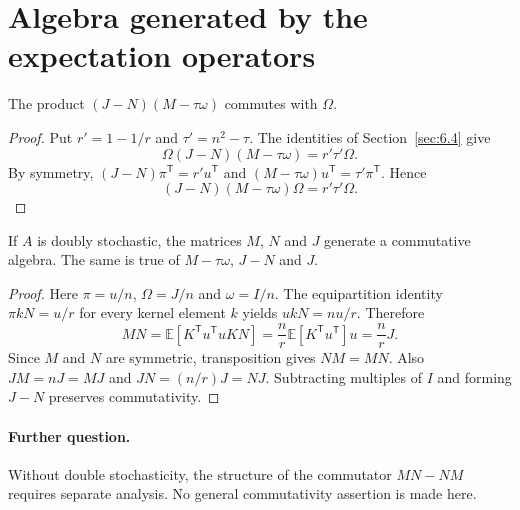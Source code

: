 
\section{Algebra generated by the expectation operators}
\label{sec:6.9}
\begin{proposition}\label{prop:6.5}
The product $(J-N)(M-\tau\omega)$ commutes with $\Omega$.
\end{proposition}
\begin{proof}
Put $r'=1-1/r$ and $\tau'=n^2-\tau$. The identities of
Section~\ref{sec:6.4} give
\[
 \Omega(J-N)(M-\tau\omega)=r'\tau'\Omega.
\]
By symmetry, $(J-N)\pi^{\mathsf T}=r'u^{\mathsf T}$ and
$(M-\tau\omega)u^{\mathsf T}=\tau'\pi^{\mathsf T}$. Hence
\[
 (J-N)(M-\tau\omega)\Omega=r'\tau'\Omega.
\]
\end{proof}

\begin{theorem}\label{thm:6.5}
If $A$ is doubly stochastic, the matrices $M$, $N$ and $J$ generate a
commutative algebra. The same is true of $M-\tau\omega$, $J-N$ and $J$.
\end{theorem}
\begin{proof}
Here $\pi=u/n$, $\Omega=J/n$ and $\omega=I/n$.
The equipartition identity $\pi kN=u/r$ for every kernel element $k$
yields $ukN=nu/r$. Therefore
\[
 MN=\mathbb E[K^{\mathsf T}u^{\mathsf T}uKN]
    =\frac nr\mathbb E[K^{\mathsf T}u^{\mathsf T}]u
    =\frac nr J.
\]
Since $M$ and $N$ are symmetric, transposition gives $NM=MN$.
Also $JM=nJ=MJ$ and $JN=(n/r)J=NJ$.
Subtracting multiples of $I$ and forming $J-N$ preserves commutativity.
\end{proof}

\paragraph{Further question.}
Without double stochasticity, the structure of the commutator $MN-NM$
requires separate analysis. No general commutativity assertion is made here.
